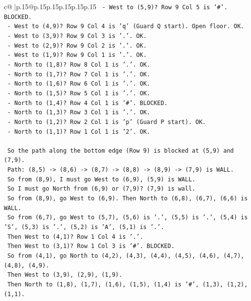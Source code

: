 \documentclass{article}
\begin{document}
{\begin{supertabular}{c@{$\;$}|p{.15\linewidth}@{}p{.15\linewidth}p{.15\linewidth}p{.15\linewidth}p{.15\linewidth}p{.15\linewidth}}
{{{\texttt{  {-} West to (5,9)? Row 9 Col 5 is '\#'. BLOCKED.} \\
\texttt{  {-} West to (4,9)? Row 9 Col 4 is 'q' (Guard Q start). Open floor. OK.} \\
\texttt{  {-} West to (3,9)? Row 9 Col 3 is '.'. OK.} \\
\texttt{  {-} West to (2,9)? Row 9 Col 2 is '.'. OK.} \\
\texttt{  {-} West to (1,9)? Row 9 Col 1 is '.'. OK.} \\
\texttt{  {-} North to (1,8)? Row 8 Col 1 is '.'. OK.} \\
\texttt{  {-} North to (1,7)? Row 7 Col 1 is '.'. OK.} \\
\texttt{  {-} North to (1,6)? Row 6 Col 1 is '.'. OK.} \\
\texttt{  {-} North to (1,5)? Row 5 Col 1 is '.'. OK.} \\
\texttt{  {-} North to (1,4)? Row 4 Col 1 is '\#'. BLOCKED.} \\
\texttt{  {-} North to (1,3)? Row 3 Col 1 is '.'. OK.} \\
\texttt{  {-} North to (1,2)? Row 2 Col 1 is 'p' (Guard P start). OK.} \\
\texttt{  {-} North to (1,1)? Row 1 Col 1 is '2'. OK.} \\
\\ 
\texttt{  So the path along the bottom edge (Row 9) is blocked at (5,9) and (7,9).} \\
\texttt{  Path: (8,5) {-}> (8,6) {-}> (8,7) {-}> (8,8) {-}> (8,9) {-}> (7,9) is WALL.} \\
\texttt{  So from (8,9), I must go West to (6,9), (5,9) is WALL.} \\
\texttt{  So I must go North from (6,9) or (7,9)? (7,9) is wall.} \\
\texttt{  So from (8,9), go West to (6,9). Then North to (6,8), (6,7), (6,6) is WALL.} \\
\texttt{  So from (6,7), go West to (5,7), (5,6) is '.', (5,5) is '.', (5,4) is 'S', (5,3) is '.', (5,2) is 'A', (5,1) is '.'.} \\
\texttt{  Then West to (4,1)? Row 1 Col 4 is '.'.} \\
\texttt{  Then West to (3,1)? Row 1 Col 3 is '\#'. BLOCKED.} \\
\texttt{  So from (4,1), go North to (4,2), (4,3), (4,4), (4,5), (4,6), (4,7), (4,8), (4,9).} \\
\texttt{  Then West to (3,9), (2,9), (1,9).} \\
\texttt{  Then North to (1,8), (1,7), (1,6), (1,5), (1,4) is '\#', (1,3), (1,2), (1,1).} \\
}}}
\end{supertabular}}
\end{document}
